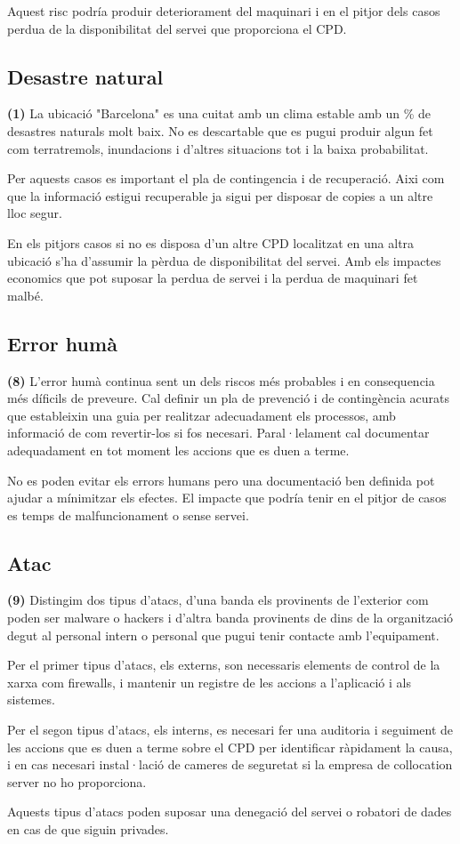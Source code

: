 Aquest risc podría produir deteriorament del maquinari i en el pitjor dels casos perdua de la disponibilitat del servei que proporciona el CPD. 

\subsection{Desastre natural}
\textbf{(1)} La ubicació "Barcelona" es una cuitat amb un clima estable amb un \% de desastres naturals molt baix. No es descartable que es pugui produir algun fet com terratremols, inundacions i d'altres situacions tot i la baixa probabilitat.

Per aquests casos es important el pla de contingencia i de recuperació. Aixi com que la informació estigui recuperable ja sigui per disposar de copies a un altre lloc segur.

En els pitjors casos si no es disposa d'un altre CPD localitzat en una altra ubicació s'ha d'assumir la pèrdua de disponibilitat del servei. Amb els impactes economics que pot suposar la perdua de servei i la perdua de maquinari fet malbé.

\subsection{Error humà}
\textbf{(8)} L'error humà continua sent un dels riscos més probables i en consequencia més díficils de preveure. Cal definir un pla de prevenció i de contingència acurats que estableixin una guia per realitzar adecuadament els processos, amb informació de com revertir-los si fos necesari. Paral·lelament cal documentar adequadament en tot moment les accions que es duen a terme.

No es poden evitar els errors humans pero una documentació ben definida pot ajudar a mínimitzar els efectes. El impacte que podría tenir en el pitjor de casos es temps de malfuncionament o sense servei. 

\subsection{Atac}
\textbf{(9)} Distingim dos tipus d'atacs, d'una banda els provinents de l'exterior com poden ser malware o hackers i d'altra banda provinents de dins de la organització degut al personal intern o personal que pugui tenir contacte amb l'equipament. 

Per el primer tipus d'atacs, els externs, son necessaris elements de control de la xarxa com firewalls, i mantenir un registre de les accions a l'aplicació i als sistemes. 

Per el segon tipus d'atacs, els interns, es necesari fer una auditoria i seguiment de les accions que es duen a terme sobre el CPD per identificar ràpidament la causa, i en cas necesari instal·lació de cameres de seguretat si la empresa de collocation server no ho proporciona.

Aquests tipus d'atacs poden suposar una denegació del servei o robatori de dades en cas de que siguin privades.

